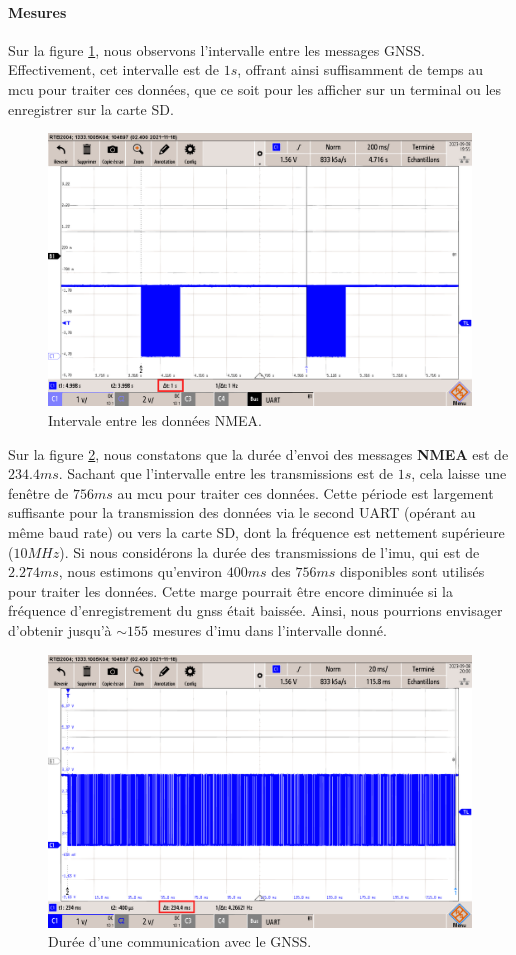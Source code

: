 \paragraph{Mesures}
Sur la figure \ref{fig:interval-gnss}, nous observons l'intervalle entre les messages GNSS. Effectivement, cet intervalle est de $1s$, offrant ainsi suffisamment de temps au \gls{mcu} pour traiter ces données, que ce soit pour les afficher sur un terminal ou les enregistrer sur la carte SD.

\begin{figure}[H]
	\centering
	\includegraphics[width=0.7\linewidth]{../figures/mesures/UART/interval-gnss}
	\caption{Intervale entre les données NMEA.}
	\label{fig:interval-gnss}
\end{figure}

Sur la figure \ref{fig:duree-comm-gnss}, nous constatons que la durée d'envoi des messages \textbf{NMEA} est de $234.4 ms$. Sachant que l'intervalle entre les transmissions est de $1s$, cela laisse une fenêtre de $756ms$ au \gls{mcu} pour traiter ces données. Cette période est largement suffisante pour la transmission des données via le second UART (opérant au même baud rate) ou vers la carte SD, dont la fréquence est nettement supérieure ($10MHz$). Si nous considérons la durée des transmissions de l'\gls{imu}, qui est de $2.274ms$, nous estimons qu'environ $400ms$ des $756ms$ disponibles sont utilisés pour traiter les données. Cette marge pourrait être encore diminuée si la fréquence d'enregistrement du \gls{gnss} était baissée. Ainsi, nous pourrions envisager d'obtenir jusqu'à $\sim155$ mesures d'\gls{imu} dans l'intervalle donné.


\begin{figure}[H]
	\centering
	\includegraphics[width=0.7\linewidth]{../figures/mesures/UART/duree-comm-gnss}
	\caption{Durée d'une communication avec le GNSS.}
	\label{fig:duree-comm-gnss}
\end{figure}

